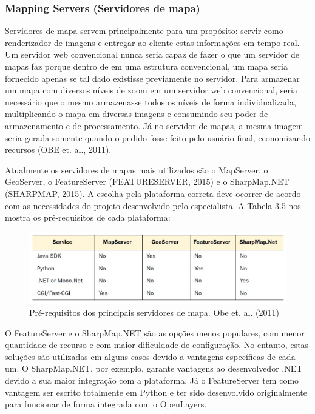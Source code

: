 		\subsubsection{Mapping Servers (Servidores de mapa)}
		
		Servidores de mapa servem principalmente para um propósito: servir como renderizador de imagens e entregar ao cliente estas informações em tempo real. Um servidor web convencional nunca seria capaz de fazer o que um servidor de mapas faz porque dentro de em uma estrutura convencional, um mapa seria fornecido apenas se tal dado existisse previamente no servidor. Para armazenar um mapa com diversos níveis de zoom em um servidor web convencional, seria necessário que o mesmo armazenasse todos os níveis de forma individualizada, multiplicando o mapa em diversas imagens e consumindo seu poder de armazenamento e de processamento. Já no servidor de mapas, a mesma imagem seria gerada somente quando o pedido fosse feito pelo usuário final, economizando recursos (OBE et. al., 2011).
		
		Atualmente os servidores de mapas mais utilizados são o MapServer, o GeoServer, o FeatureServer (FEATURESERVER, 2015) e o SharpMap.NET (SHARPMAP, 2015). A escolha pela plataforma correta deve ocorrer de acordo com as necessidades do projeto desenvolvido pelo especialista. A Tabela 3.5 nos mostra os pré-requisitos de cada plataforma:
		
		\begin{figure}
			\centering
			\includegraphics[width=1\linewidth]{data/prerequisitos_mapping_servers}
			\caption{Pré-requisitos dos principais servidores de mapa. Obe et. al. (2011)}
			\label{fig:prerequisitosmappingservers}
		\end{figure}
		
		O FeatureServer e o SharpMap.NET são as opções menos populares, com menor quantidade de recurso e com maior dificuldade de configuração. No entanto, estas soluções são utilizadas em alguns casos devido a vantagens específicas de cada um. O SharpMap.NET, por exemplo, garante vantagens ao desenvolvedor .NET devido a sua maior integração com a plataforma. Já o FeatureServer tem como vantagem ser escrito totalmente em Python e ter sido desenvolvido originalmente para funcionar de forma integrada com o OpenLayers. 
		
